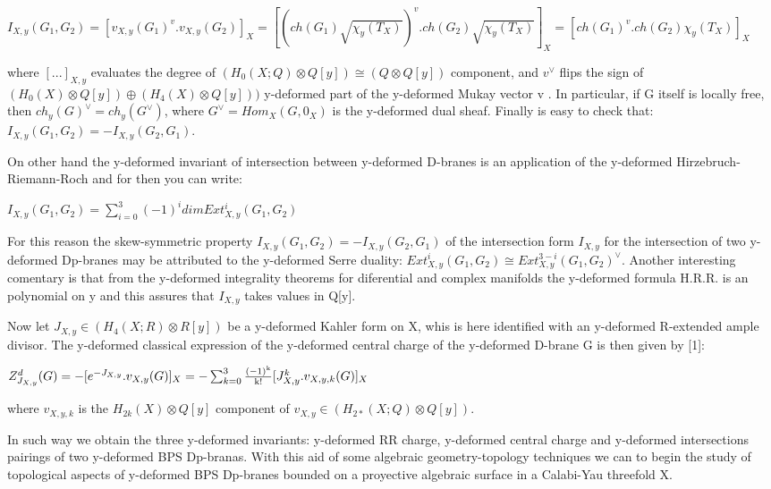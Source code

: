 \documentclass[a4paper,a4paper]{article}
\begin{document}
\begin{center}
\setlength{\baselineskip}{30pt}
{  $ I_{X,y}(G_1,G_2)=[v_{X,y}(G_1)^v.v_{X,y}(G_2)]_X=[(ch(G_1)\sqrt{{\chi}_y(T_{X})})^v.ch(G_2)\sqrt{{\chi}_y(T_{X})}]_X=[ch(G_1)^v.ch(G_2){\chi}_y(T_{X})]_X $ }
\end{center}

where $ [...]_{X,y} $  evaluates the degree of $ (H_{0}(X;Q){\otimes}Q[y]){\cong}(Q{\otimes}Q[y])$ component, and $v^{\vee}$ flips the sign of $(H_{0}(X){\otimes}Q[y]){\oplus}(H_{4}(X){\otimes}Q[y]))$ y-deformed part of the y-deformed  Mukay vector v . In particular, if G itself is locally free, then $ch_{y}(G)^{\vee}=ch_y(G^{\vee})$, where  $ G^{\vee}=Hom_{X}(G,0_X)$ is the y-deformed dual sheaf. Finally is easy to check that: $I_{X,y}(G_1,G_2) =-I_{X,y}(G_2,G_1)$.

On other hand the y-deformed invariant of intersection between y-deformed D-branes is an application of the y-deformed Hirzebruch-Riemann-Roch and for then you can write:

 
\begin{center}

{  $ I_{X,y}(G_1,G_2)=\sum_{i=0}^{3}(-1)^idimExt^i_{X,y}(G_1,G_2) $ }
\end{center}
For this reason the skew-symmetric property $I_{X,y}(G_1,G_2) =-I_{X,y}(G_2,G_1)$ of the intersection form $I_{X,y}$  for the intersection of two y-deformed Dp-branes may be attributed to the y-deformed Serre duality: $Ext^i_{X,y}(G_1,G_2){\cong}Ext^{3-i}_{X,y}(G_1,G_2)^{\vee}$. Another interesting comentary is that from the y-deformed integrality theorems for diferential and complex manifolds the y-deformed formula H.R.R. is an polynomial on y  and this assures that $I_{X,y}$ takes values in Q[y].
 

Now let $J_{X,y}{\in}(H_{4}(X;R){\otimes}R[y]) $  be a y-deformed Kahler form on X, whis is here identified with an y-deformed R-extended ample divisor. The y-deformed classical expression of the y-deformed central charge of the y-deformed D-brane G is then given by [1]:
\begin{center}
{  $ Z_{J_{X,y}}^d(G)=-[e^{-J_{X,y}}.v_{X,y}(G)]_{X}=-\sum_{k=0}^{3}{\frac{\rm (-1)^{k}}{\rm k!}[J_{X,y}^k.v_{X,y,k}(G)]_{X}} $ }
\end{center}

where $v_{X,y,k} $ is the $H_{2k}(X){\otimes}Q[y] $ component of $v_{X,y}{\in}(H_{2*}(X;Q){\otimes}Q[y]) $.

In such way we obtain the three y-deformed invariants: y-deformed RR charge,
y-deformed central charge and y-deformed intersections pairings of two y-deformed BPS Dp-branas. With this aid of some algebraic geometry-topology techniques we can to begin the study of topological aspects of y-deformed BPS Dp-branes bounded on a proyective algebraic surface in a Calabi-Yau threefold X. 
\end{document}
